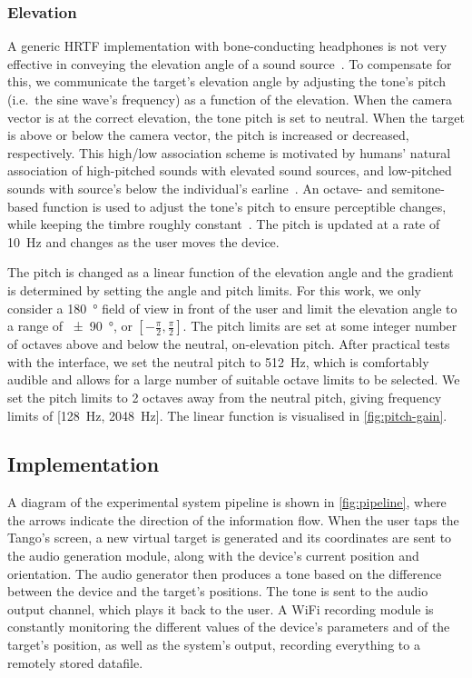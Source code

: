 \documentclass{llncs}
\begin{document}
\subsubsection{Elevation}

A generic HRTF implementation with bone-conducting headphones is not very effective in conveying the elevation angle of a sound source~\cite{macdonald2006spatial,schonstein2008comparison}.
To compensate for this, we communicate the target's elevation angle by adjusting the tone's pitch (i.e.\ the sine wave's frequency) as a function of the elevation. 
When the camera vector is at the correct elevation, the tone pitch is set to neutral.
When the target is above or below the camera vector, the pitch is increased or decreased, respectively.
This high/low association scheme is motivated by humans' natural association of high-pitched sounds with elevated sound sources, and low-pitched sounds with source's below the individual's earline~\cite{pratt1930spatial,blauert1997spatial}.
An octave- and semitone-based function is used to adjust the tone's pitch to ensure perceptible changes, while keeping the timbre roughly constant~\cite{shepard1964circularity}.
The pitch is updated at a rate of \SI{10}{\hertz} and changes as the user moves the device.

The pitch is changed as a linear function of the elevation angle and the gradient is determined by setting the angle and pitch limits.
For this work, we only consider a \SI{180}{\degree} field of view in front of the user and limit the elevation angle to a range of \SI{\pm90}{\degree}, or $[-\frac{\pi}{2}, \frac{\pi}{2}]$.
The pitch limits are set at some integer number of octaves above and below the neutral, on-elevation pitch.
After practical tests with the interface, we set the neutral pitch to \SI{512}{\hertz}, which is comfortably audible and allows for a large number of suitable octave limits to be selected.
We set the pitch limits to 2 octaves away from the neutral pitch, giving frequency limits of [\SI{128}{\hertz}, \SI{2048}{\hertz}].
The linear function is visualised in \cref{fig:pitch-gain}.

\subsection{Implementation}

A diagram of the experimental system pipeline is shown in \cref{fig:pipeline}, where the arrows indicate the direction of the information flow.
When the user taps the Tango's screen, a new virtual target is generated and its coordinates are sent to the audio generation module, along with the device's current position and orientation.
The audio generator then produces a tone based on the difference between the device and the target's positions. The tone is sent to the audio output channel, which plays it back to the user.
A WiFi recording module is constantly monitoring the different values of the device's parameters and of the target's position, as well as the system's output, recording everything to a remotely stored datafile. 
\end{document}
